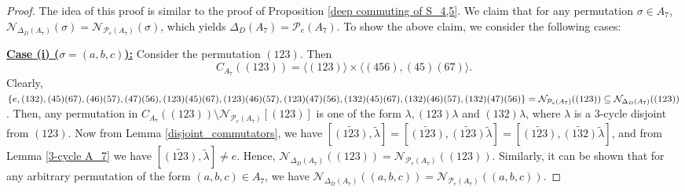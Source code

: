\documentclass[12pt,a4paper]{article}
\begin{document}
\begin{proof}
The idea of this proof is similar to the proof of Proposition \ref{deep commuting of S_4,5}. We claim that for any permutation $\sigma\in A_7$, $\mathcal{N}_{\Delta_D(A_7)}(\sigma)=\mathcal{N}_{\mathcal{P}_e(A_7)}(\sigma)$, which yields $\Delta_D(A_7)=\mathcal{P}_e(A_7)$. To show the above claim, we consider the following cases:  

\vspace{.3cm}
\noindent\underline{\bf{Case (i) ($\sigma=(a,b,c)$):}} Consider the permutation $(123)$. Then \[C_{A_7}((123))=\langle (123)\rangle\times\langle (456),(45)(67)\rangle.\] Clearly, $\{e,(132),(45)(67),(46)(57),(47)(56),(123)(45)(67),(123)(46)(57),(123)(47)(56),\\ (132)(45)(67),(132)(46)(57),(132)(47)(56)\}=\mathcal{N}_{\mathcal{P}_e(A_7)}((123))\subseteq \mathcal{N}_{\Delta_D(A_7)}((123))$. Then, any permutation in $C_{A_7}((123))\setminus\mathcal{N}_{\mathcal{P}_e(A_7)}[(123)]$ is one of the form $\lambda, (123)\lambda$ and $(132)\lambda$, where $\lambda$ is a $3$-cycle disjoint from $(123)$. Now from Lemma \ref{disjoint_commutators}, we have $[\tilde{(123)},\tilde{\lambda}]=[\tilde{(123)},\tilde{(123)}\tilde{\lambda}]=[\tilde{(123)},\tilde{(132)}\tilde{\lambda}]$, and from Lemma \ref{3-cycle A_7}
we have $[\tilde{(123)},\tilde{\lambda}]\neq e$. Hence, $\mathcal{N}_{\Delta_D(A_7)}((123))=\mathcal{N}_{\mathcal{P}_e(A_7)}((123))$. Similarly, it can be shown that for any arbitrary permutation of the form $(a,b,c)\in A_7$, we have $\mathcal{N}_{\Delta_D(A_7)}((a,b,c))=\mathcal{N}_{\mathcal{P}_e(A_7)}((a,b,c))$.


\end{proof}
\end{document}
